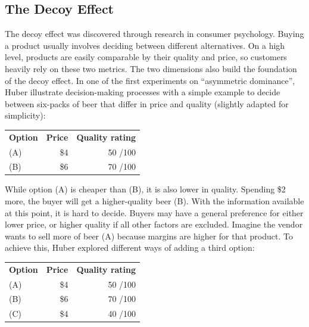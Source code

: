 \subsection{The Decoy Effect}
The decoy effect was discovered through research in consumer psychology. Buying a product usually involves deciding between different alternatives. On a high level, products are easily comparable by their quality and price, so customers heavily rely on these two metrics. The two dimensions also build the foundation of the decoy effect. In one of the first experiments on ``asymmetric dominance'', Huber \etal illustrate decision-making processes with a simple example to decide between six-packs of beer that differ in price and quality \cite{Huber1982AsymetricallyDominated} (slightly adapted for simplicity): 
\begin{table}[!h]
\begin{tabular}{lrr}
	\textbf{Option} & \textbf{Price} & \textbf{Quality rating}\\
	(A) & \$4 & 50 /100\\
	(B) & \$6 & 70 /100\\
\end{tabular}
\end{table}

While option (A) is cheaper than (B), it is also lower in quality. Spending \$2 more, the buyer will get a higher-quality beer (B). With the information available at this point, it is hard to decide. 
Buyers may have a general preference for either lower price, or higher quality if all other factors are excluded. Imagine the vendor wants to sell more of beer (A) because margins are higher for that product. To achieve this, Huber \etal explored different ways of adding a third option:
\begin{table}[!h]
\begin{tabular}{lrr}
	\textbf{Option} & \textbf{Price} & \textbf{Quality rating}\\
	(A) & \$4 & 50 /100 \\
	(B) & \$6 & 70 /100\\
	(C) & \$4 & 40 /100 \\
\end{tabular} 
\end{table}


